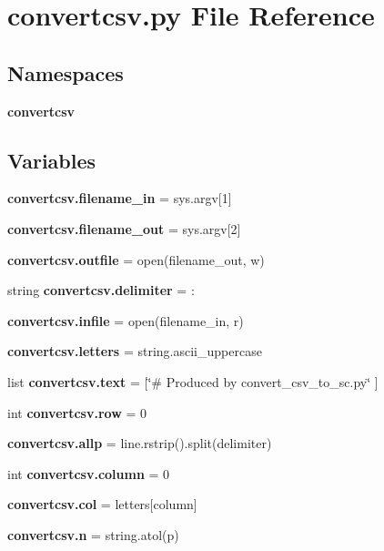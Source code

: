 \section{convertcsv.\+py File Reference}
\label{convertcsv_8py}
\subsection*{Namespaces}
\begin{DoxyCompactItemize}
\item 
 \textbf{ convertcsv}
\end{DoxyCompactItemize}
\subsection*{Variables}
\begin{DoxyCompactItemize}
\item 
\textbf{ convertcsv.\+filename\+\_\+in} = sys.\+argv[1]
\item 
\textbf{ convertcsv.\+filename\+\_\+out} = sys.\+argv[2]
\item 
\textbf{ convertcsv.\+outfile} = open(filename\+\_\+out, \textquotesingle{}w\textquotesingle{})
\item 
string \textbf{ convertcsv.\+delimiter} = \textquotesingle{}\+:\textquotesingle{}
\item 
\textbf{ convertcsv.\+infile} = open(filename\+\_\+in, \textquotesingle{}r\textquotesingle{})
\item 
\textbf{ convertcsv.\+letters} = string.\+ascii\+\_\+uppercase
\item 
list \textbf{ convertcsv.\+text} = [\char`\"{}\# Produced by convert\+\_\+csv\+\_\+to\+\_\+sc.\+py\char`\"{} ]
\item 
int \textbf{ convertcsv.\+row} = 0
\item 
\textbf{ convertcsv.\+allp} = line.\+rstrip().split(delimiter)
\item 
int \textbf{ convertcsv.\+column} = 0
\item 
\textbf{ convertcsv.\+col} = letters[column]
\item 
\textbf{ convertcsv.\+n} = string.\+atol(p)
\end{DoxyCompactItemize}
